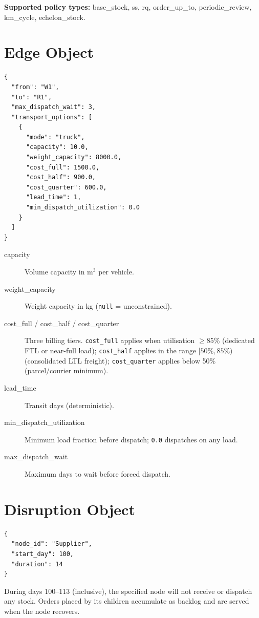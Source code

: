 \textbf{Supported policy types:}
base\_stock, ss, rq, order\_up\_to,
periodic\_review, km\_cycle, echelon\_stock.

\section*{Edge Object}

\begin{verbatim}
{
  "from": "W1",
  "to": "R1",
  "max_dispatch_wait": 3,
  "transport_options": [
    {
      "mode": "truck",
      "capacity": 10.0,
      "weight_capacity": 8000.0,
      "cost_full": 1500.0,
      "cost_half": 900.0,
      "cost_quarter": 600.0,
      "lead_time": 1,
      "min_dispatch_utilization": 0.0
    }
  ]
}
\end{verbatim}

\begin{description}
  \item[capacity] Volume capacity in m$^3$ per vehicle.
  \item[weight\_capacity] Weight capacity in kg (\texttt{null} = unconstrained).
  \item[cost\_full / cost\_half / cost\_quarter] Three billing tiers.
        \texttt{cost\_full} applies when utilisation $\geq 85\%$ (dedicated
        FTL or near-full load); \texttt{cost\_half} applies in the range
        $[50\%, 85\%)$ (consolidated LTL freight); \texttt{cost\_quarter}
        applies below 50\% (parcel/courier minimum).
  \item[lead\_time] Transit days (deterministic).
  \item[min\_dispatch\_utilization] Minimum load fraction before
        dispatch; \texttt{0.0} dispatches on any load.
  \item[max\_dispatch\_wait] Maximum days to wait before forced dispatch.
\end{description}

\vspace{2em}
\section*{Disruption Object}

\begin{verbatim}
{
  "node_id": "Supplier",
  "start_day": 100,
  "duration": 14
}
\end{verbatim}

During days 100--113 (inclusive), the specified node will not
receive or dispatch any stock.  Orders placed by its children accumulate
as backlog and are served when the node recovers.
